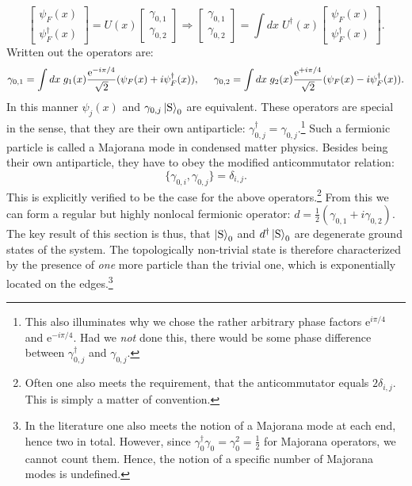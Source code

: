 \begin{equation}
\begin{bmatrix} \psi_F(x) \\ \psi_F^\dagger(x) \end{bmatrix} = U(x) \begin{bmatrix} \gamma_{0,1} \\ \gamma_{0,2} \end{bmatrix} \Rightarrow \begin{bmatrix} \gamma_{0,1} \\ \gamma_{0,2} \end{bmatrix} = \int dx \; U^\dagger(x) \begin{bmatrix} \psi_F(x) \\ \psi_F^\dagger(x) \end{bmatrix}.
\label{eq.Majoranaedgemodedef} 
\end{equation}
Written out the operators are:
\begin{equation}
\gamma_{0,1} = \int dx \; g_1(x) \frac{\text{e}^{-i\pi/4}}{\sqrt{2}}(\psi_F(x) + i\psi^\dagger_F(x)), \hspace{0.5cm} \gamma_{0,2} = \int dx \; g_2(x) \frac{\text{e}^{+i\pi/4}}{\sqrt{2}}(\psi_F(x) - i\psi^\dagger_F(x)).
\label{eq.Majoranaedgemodegeneraldef} 
\end{equation}
In this manner $\psi_j(x)$ and $\gamma_{0,j}\ket{\text{S}}_0$ are equivalent. These operators are special in the sense, that they are their own antiparticle: $\gamma_{0,j}^\dagger = \gamma_{0,j}$.\footnote{This also illuminates why we chose the rather arbitrary phase factors $\text{e}^{i\pi/4}$ and $\text{e}^{-i\pi/4}$. Had we \textit{not} done this, there would be some phase difference between $\gamma^\dagger_{0,j}$ and $\gamma_{0,j}$.} Such a fermionic particle is called a Majorana mode in condensed matter physics. Besides being their own antiparticle, they have to obey the modified anticommutator relation:
\begin{equation}
\{\gamma_{0,i}, \gamma_{0,j} \} = \delta_{i,j}. \nonumber
\end{equation}
This is explicitly verified to be the case for the above operators.\footnote{Often one also meets the requirement, that the anticommutator equals $2\delta_{i,j}$. This is simply a matter of convention.} From this we can form a regular but highly nonlocal fermionic operator: $d = \frac{1}{2}(\gamma_{0,1} + i\gamma_{0,2})$. The key result of this section is thus, that $\ket{\text{S}}_0$ and $d^\dagger\ket{\text{S}}_0$ are degenerate ground states of the system. The topologically non-trivial state is therefore characterized by the presence of \textit{one} more particle than the trivial one, which is exponentially located on the edges.\footnote{In the literature one also meets the notion of a Majorana mode at each end, hence two in total. However, since $\gamma^\dagger_0\gamma_0 = \gamma_0^2 = \frac{1}{2}$ for Majorana operators, we cannot count them. Hence, the notion of a specific number of Majorana modes is undefined.}

